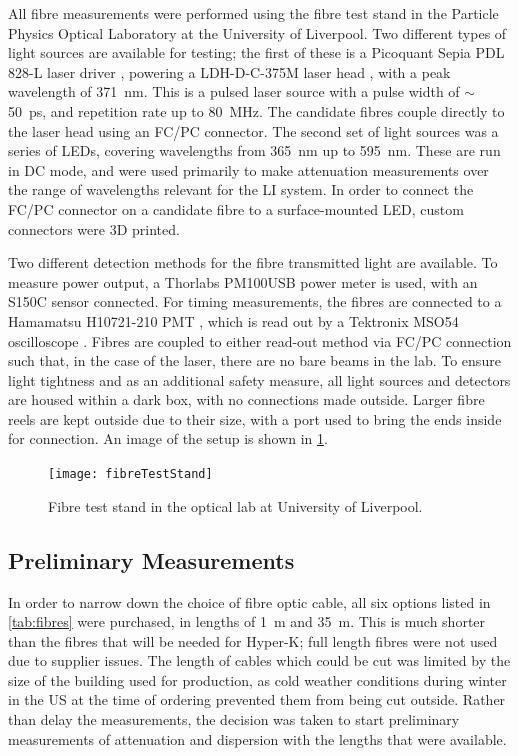 \documentclass[a4paper,11pt]{article}
\let\oldsim\sim
\renewcommand{\sim}{{\oldsim}}
\begin{document}
All fibre measurements were performed using the fibre test stand in the Particle Physics Optical Laboratory at the University of Liverpool. Two different types of light sources are available for testing; the first of these is a Picoquant Sepia PDL 828-L laser driver \cite{bib:laserdriver}, powering a LDH-D-C-375M laser head \cite{bib:laserhead}, with a peak wavelength of 371~nm. This is a pulsed laser source with a pulse width of $\sim$50~ps, and repetition rate up to 80~MHz. The candidate fibres couple directly to the laser head using an FC/PC connector. The second set of light sources was a series of LEDs, covering wavelengths from 365~nm up to 595~nm. These are run in DC mode, and were used primarily to make attenuation measurements over the range of wavelengths relevant for the LI system. In order to connect the FC/PC connector on a candidate fibre to a surface-mounted LED, custom connectors were 3D printed.

Two different detection methods for the fibre transmitted light are available. To measure power output, a Thorlabs PM100USB \cite{bib:opm} power meter is used, with an S150C sensor \cite{bib:opmsensor} connected. For timing measurements, the fibres are connected to a Hamamatsu H10721-210 PMT \cite{bib:hpmt}, which is read out by a Tektronix MSO54 oscilloscope \cite{bib:scope}. Fibres are coupled to either read-out method via FC/PC connection such that, in the case of the laser, there are no bare beams in the lab. To ensure light tightness and as an additional safety measure, all light sources and detectors are housed within a dark box, with no connections made outside. Larger fibre reels are kept outside due to their size, with a port used to bring the ends inside for connection. An image of the setup is shown in \cref{fig:fibreteststand}.

\begin{figure}[h]
\centering
\texttt{[image: fibreTestStand]}
\caption{Fibre test stand in the optical lab at University of Liverpool.}\label{fig:fibreteststand}
\end{figure}

\subsection{Preliminary Measurements}

In order to narrow down the choice of fibre optic cable, all six options listed in \cref{tab:fibres} were purchased, in lengths of 1~m and 35~m. This is much shorter than the fibres that will be needed for Hyper-K; full length fibres were not used due to supplier issues. The length of cables which could be cut was limited by the size of the building used for production, as cold weather conditions during winter in the US at the time of ordering prevented them from being cut outside. Rather than delay the measurements, the decision was taken to start preliminary measurements of attenuation and dispersion with the lengths that were available.
\end{document}
